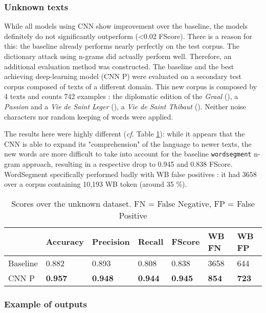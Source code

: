 \documentclass{jdmdh}
\begin{document}
\subsubsection{Unknown texts}

While all models using CNN show improvement over the baseline, the models definitely do not significantly outperform (\textless 0.02 FScore). There is a reason for this: the baseline already performs nearly perfectly on the test corpus. The dictionary attack using n-grams did actually perform well. Therefore, an additional evaluation method was constructed. The baseline and the best achieving deep-learning model (CNN P) were evaluated on a secondary test corpus composed of texts of a different domain. This new corpus is composed by 4 texts and counts 742 examples : the diplomatic edition of the \textit{Graal} (\citet{graal}), a \textit{Passion} and a \textit{Vie de Saint Leger}  (\citet{old_french_corpus}), a \textit{Vie de Saint Thibaut} (\citet{theobaldus}). Neither noise characters nor random keeping of words were applied.

The results here were highly different (\textit{cf.} Table \ref{tab:scores_unknown}): while it appears that the CNN is able to expand its "comprehension" of the language to newer texts, the new words are more difficult to take into account for the baseline \texttt{wordsegment} n-gram approach, resulting in a respective drop to 0.945 and 0.838 FScore. WordSegment specifically performed badly with WB false positives : it had 3658 over a corpus containing 10,193 WB token (around 35 \%).

\begin{table}[!ht]
\centering
\begin{tabular}{lllllll}
\hline
 & Accuracy & Precision & Recall & FScore & WB FN & WB FP \\ \hline
Baseline & 0.882 & 0.893 & 0.808 & 0.838 & 3658 & 644 \\
CNN P & \textbf{0.957} & \textbf{0.948} & \textbf{0.944} & \textbf{0.945} & \textbf{854} & \textbf{723} \\ \hline
\end{tabular}
\caption{Scores over the unknown dataset. FN = False Negative, FP = False Positive}
\label{tab:scores_unknown}
\end{table}

\subsubsection{Example of outputs}
\end{document}
